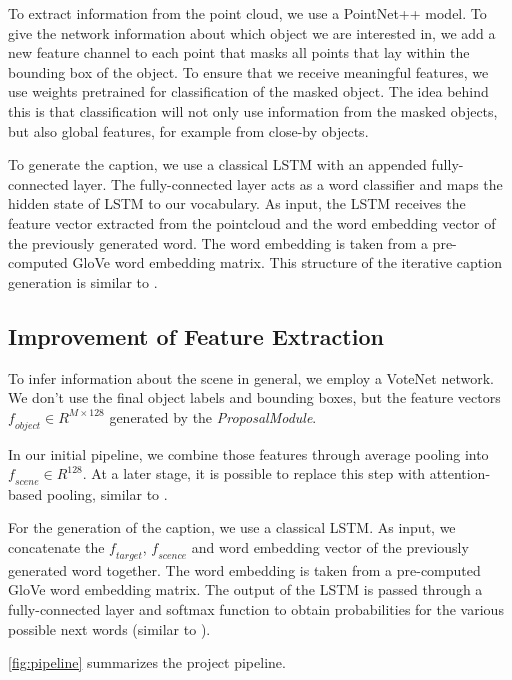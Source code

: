 \documentclass[10pt,twocolumn,letterpaper]{article}
\begin{document}
To extract information from the point cloud, we use a PointNet++ \cite{qi2017pointnet++} model. To give the network information about which object we are interested in, we add a new feature channel to each point that masks all points that lay within the bounding box of the object. To ensure that we receive meaningful features, we use weights pretrained for classification of the masked object. The idea behind this is that classification will not only use information from the masked objects, but also global features, for example from close-by objects. 

To generate the caption, we use a classical LSTM with an appended fully-connected layer. The fully-connected layer acts as a word classifier and maps the hidden state of LSTM to our vocabulary. As input, the LSTM receives the feature vector extracted from the pointcloud and the word embedding vector of the previously generated word. The word embedding is taken from a pre-computed GloVe \cite{pennington2014glove} word embedding matrix. This structure of the iterative caption generation is similar to \cite{xu2015show}.

\subsection{Improvement of Feature Extraction}


To infer information about the scene in general, we employ a VoteNet \cite{qi2019deep} network. We don't use the final object labels and bounding boxes, but the feature vectors $\mathit{f_{object}}\in R^{M\times128}$ generated by the \textit{ProposalModule}.

In our initial pipeline, we combine those features through average pooling into $\mathit{f_{scene}}\in R^{128}$. At a later stage, it is possible to replace this step with attention-based pooling, similar to \cite{anderson2018bottom}.

For the generation of the caption, we use a classical LSTM. As input, we concatenate the $\mathit{f_{target}}$, $\mathit{f_{scence}}$ and word embedding vector of the previously generated word together. The word embedding is taken from a pre-computed GloVe \cite{pennington2014glove} word embedding matrix. The output of the LSTM is passed through a fully-connected layer and softmax function to obtain probabilities for the various possible next words (similar to \cite{xu2015show}).

\autoref{fig:pipeline} summarizes the project pipeline.
\end{document}

